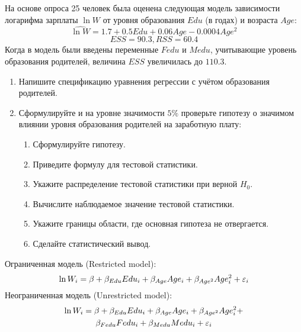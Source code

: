 \begin{problem}
На основе опроса 25 человек была оценена следующая модель зависимости логарифма зарплаты $\ln W$ от уровня образования $Edu$ (в годах) и возраста $Age$:
\[
\widehat{\ln W} = 1.7 + 0.5Edu + 0.06Age - 0.0004Age^2
\]
\[
ESS = 90.3, RSS = 60.4
\]
Когда в модель были введены переменные $Fedu$ и $Medu$, учитывающие уровень образования родителей, величина $ESS$ увеличилась до $110.3.$
\begin{enumerate}
\item Напишите спецификацию уравнения регрессии с учётом образования родителей.
\item Сформулируйте и на уровне значимости $5\%$ проверьте гипотезу о значимом влиянии уровня образования родителей на заработную плату:
\begin{enumerate}
\item Сформулируйте гипотезу.
\item Приведите формулу для тестовой статистики.
\item Укажите распределение тестовой статистики при верной $H_0$.
\item Вычислите наблюдаемое значение тестовой статистики.
\item Укажите границы области, где основная гипотеза не отвергается.
\item Сделайте статистический вывод.
\end{enumerate}
\end{enumerate}


\begin{sol}

Ограниченная модель (Restricted model):
\[
\ln W_i = \beta + \beta_{Edu}Edu_i + \beta_{Age}Age_i + \beta_{Age^2}Age^2_i + \varepsilon_i
\]
Неограниченная модель (Unrestricted model):
\begin{multline*}
\ln W_i = \beta + \beta_{Edu}Edu_i + \beta_{Age}Age_i + \beta_{Age^2}Age^2_i + \\
\beta_{Fedu}Fedu_i + \beta_{Medu}Medu_i + \varepsilon_i
\end{multline*}


\end{sol}
\end{problem}
